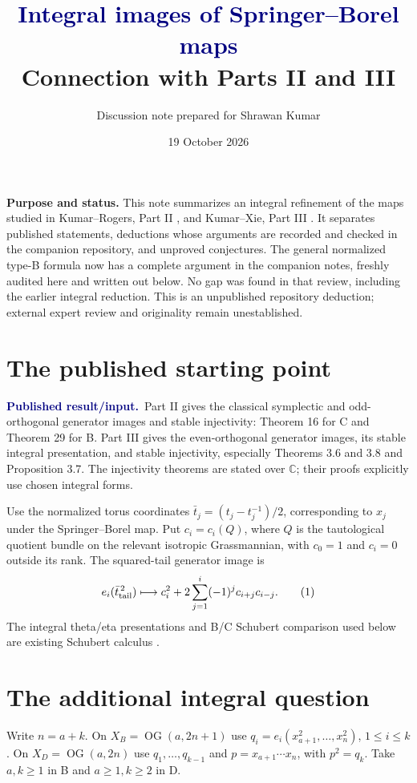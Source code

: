 \documentclass[11pt,letterpaper]{article}
\title{\vspace{-1.5em}\textcolor{navy}{Integral images of Springer--Borel maps}\\[4pt]
\large Connection with Parts II and III}
\author{Discussion note prepared for Shrawan Kumar}
\date{19 October 2026}
\newcommand{\C}{\mathbb C}
\newcommand{\OG}{\operatorname{OG}}
\newcommand{\published}{\textcolor{navy}{\textbf{Published result/input.}}\ }
\begin{document}
\maketitle
\thispagestyle{empty}
\vspace{-1.0em}

\textbf{Purpose and status.}
This note summarizes an integral refinement of the maps studied in
Kumar--Rogers, Part II \cite{KR}, and Kumar--Xie, Part III \cite{KX}.
It separates published statements, deductions whose arguments are recorded
and checked in the companion repository, and unproved conjectures.
The general normalized type-B formula now has a complete argument in the
companion notes, freshly audited here and written out below.
No gap was found in that review, including the earlier integral reduction.
This is an unpublished repository deduction; external expert review and
originality remain unestablished.

\section{The published starting point}
\published Part II gives the classical symplectic and odd-orthogonal
generator images and stable injectivity: Theorem 16 for C and Theorem 29
for B. Part III gives the even-orthogonal generator images, its stable
integral presentation, and stable injectivity, especially Theorems 3.6 and
3.8 and Proposition 3.7. The injectivity theorems are stated over \(\C\);
their proofs explicitly use chosen integral forms.

Use the normalized torus coordinates
\(\bar t_j=(t_j-t_j^{-1})/2\), corresponding to \(x_j\) under the
Springer--Borel map. Put \(c_i=c_i(Q)\), where \(Q\) is the tautological
quotient bundle on the relevant isotropic Grassmannian, with \(c_0=1\)
and \(c_i=0\) outside its rank. The squared-tail generator image is
\[
 e_i(\bar t_{\rm tail}^{\,2})
 \longmapsto c_i^2+
 2\sum_{j=1}^{i}(-1)^j c_{i+j}c_{i-j}.
 \tag{1}
\]
The integral theta/eta presentations and B/C Schubert comparison used
below are existing Schubert calculus \cite{BKTIG,BKTD}.

\section{The additional integral question}
Write \(n=a+k\). On
\(X_B=\OG(a,2n+1)\) use
\(q_i=e_i(x_{a+1}^2,\ldots,x_n^2)\), \(1\le i\le k\).
On \(X_D=\OG(a,2n)\) use \(q_1,\ldots,q_{k-1}\) and
\(p=x_{a+1}\cdots x_n\), with \(p^2=q_k\).
Take \(a,k\ge1\) in B and \(a\ge1,k\ge2\) in D.
\end{document}
